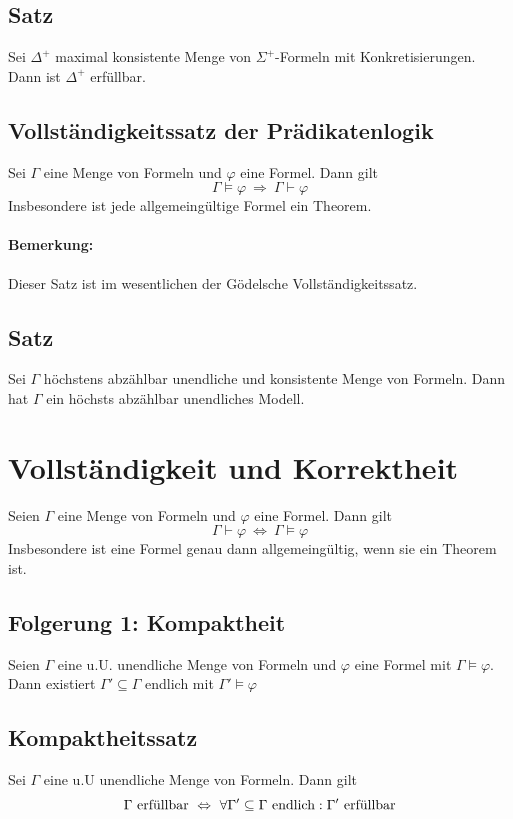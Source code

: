 \documentclass[12pt,a4paper]{report}
\newcommand{\RA}{\Rightarrow}
\newcommand{\green}[1]{\textcolor[rgb]{0.1,0.6,0.1}{#1}}
\newcommand{\blue}[1]{\textcolor[rgb]{0.2,0.2,1}{#1}}
\begin{document}
\subsection{\green{Satz}}
Sei $ \Delta^+ $ maximal konsistente Menge von $ \Sigma^+ $-Formeln mit Konkretisierungen. Dann ist $ \Delta^+ $ erfüllbar.
\subsection{\green{Vollständigkeitssatz der Prädikatenlogik}}
Sei $ \Gamma $ eine Menge von Formeln und $ \varphi $ eine Formel. Dann gilt
\[
    \Gamma \vDash \varphi ~\RA~ \Gamma \vdash \varphi
\]
Insbesondere ist jede allgemeingültige Formel ein Theorem.
\paragraph{Bemerkung:} Dieser Satz ist im wesentlichen der Gödelsche Vollständigkeitssatz.
\subsection{\green{Satz}}
Sei $ \Gamma $ höchstens abzählbar unendliche und konsistente Menge von Formeln. Dann hat $ \Gamma $ ein höchsts abzählbar unendliches Modell.

\section{\blue{Vollständigkeit und Korrektheit}}
Seien $ \Gamma $ eine Menge von Formeln und $ \varphi $ eine Formel. Dann gilt
\[
    \Gamma \vdash \varphi ~\Leftrightarrow~ \Gamma \vDash \varphi
\]
Insbesondere ist eine Formel genau dann allgemeingültig, wenn sie ein Theorem ist.

\subsection{\green{Folgerung 1: Kompaktheit}}
Seien $ \Gamma $ eine u.U. unendliche Menge von Formeln und $ \varphi $ eine Formel mit $ \Gamma \vDash \varphi $. Dann existiert $ \Gamma' \subseteq \Gamma $ endlich mit $ \Gamma' \vDash \varphi $
\subsection{\green{Kompaktheitssatz}}
Sei $ \Gamma $ eine u.U unendliche Menge von Formeln. Dann gilt
\[
    \Gamma\textnormal{ erfüllbar} ~\Leftrightarrow~ \forall \Gamma' \subseteq \Gamma \textnormal{ endlich}: \Gamma' \textnormal{ erfüllbar}
\]
\end{document}
